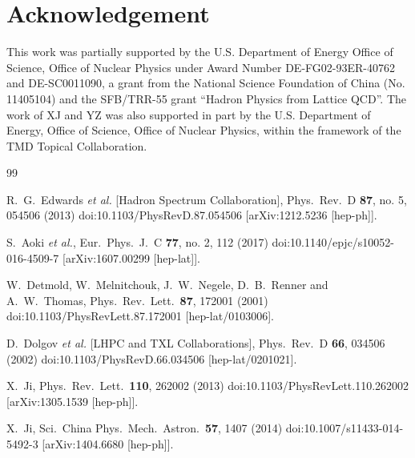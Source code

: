 \section*{Acknowledgement}
This work was partially supported by the U.S. Department of Energy Office of Science, Office of Nuclear Physics under Award Number DE-FG02-93ER-40762 and DE-SC0011090, a grant from the National Science Foundation of China (No. 11405104) and the SFB/TRR-55 grant ``Hadron Physics from Lattice QCD''. The work of XJ and YZ was also supported in part by the U.S. Department of Energy, Office of Science, Office of Nuclear Physics, within the framework of the TMD Topical Collaboration.


\begin{thebibliography}{99}

  R.~G.~Edwards {\it et al.} [Hadron Spectrum Collaboration],
  Phys.\ Rev.\ D {\bf 87}, no. 5, 054506 (2013)
  doi:10.1103/PhysRevD.87.054506
  [arXiv:1212.5236 [hep-ph]].

  S.~Aoki {\it et al.},
  Eur.\ Phys.\ J.\ C {\bf 77}, no. 2, 112 (2017)
  doi:10.1140/epjc/s10052-016-4509-7
  [arXiv:1607.00299 [hep-lat]].


	W.~Detmold, W.~Melnitchouk, J.~W.~Negele, D.~B.~Renner and A.~W.~Thomas,
	Phys.\ Rev.\ Lett.\  {\bf 87}, 172001 (2001)
	doi:10.1103/PhysRevLett.87.172001
	[hep-lat/0103006].


	D.~Dolgov {\it et al.} [LHPC and TXL Collaborations],
	Phys.\ Rev.\ D {\bf 66}, 034506 (2002)
	doi:10.1103/PhysRevD.66.034506
	[hep-lat/0201021].


	X.~Ji,
	Phys.\ Rev.\ Lett.\  {\bf 110}, 262002 (2013)
	doi:10.1103/PhysRevLett.110.262002
	[arXiv:1305.1539 [hep-ph]].


	X.~Ji,
	Sci.\ China Phys.\ Mech.\ Astron.\  {\bf 57}, 1407 (2014)
	doi:10.1007/s11433-014-5492-3
	[arXiv:1404.6680 [hep-ph]].



\end{thebibliography}
